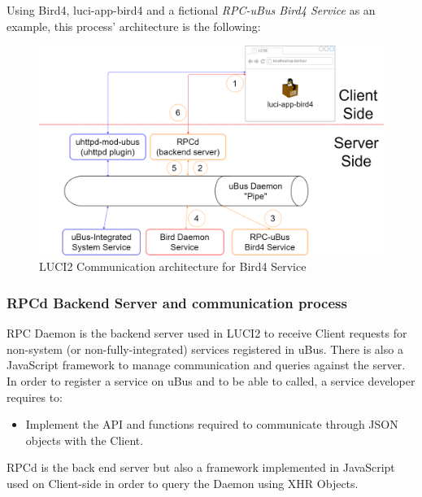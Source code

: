 Using Bird4, luci-app-bird4 and a fictional \textit{RPC-uBus Bird4 Service} as an example, this process' architecture is the following:

\begin{figure}[H]
    \centering
    \includegraphics[width=\textwidth]{images/luci2/luci2d}
    \caption{LUCI2 Communication architecture for Bird4 Service}
    \label{fig:functionsp}
\end{figure}


\subsubsection{RPCd Backend Server and communication process}
RPC Daemon is the backend server used in LUCI2 to receive Client requests for non-system (or non-fully-integrated) services registered in uBus. There is also a JavaScript framework to manage communication and queries against the server.
In order to register a service on uBus and to be able to called, a service developer requires to:

\begin{itemize}
    \item Implement the API and functions required to communicate through JSON objects with the Client.
\end{itemize}








    RPCd is the back end server but also a framework implemented in JavaScript used on Client-side in order to query the Daemon using XHR Objects.

